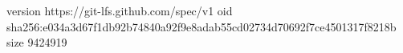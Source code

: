 version https://git-lfs.github.com/spec/v1
oid sha256:e034a3d67f1db92b74840a92f9e8adab55cd02734d70692f7ce4501317f8218b
size 9424919
